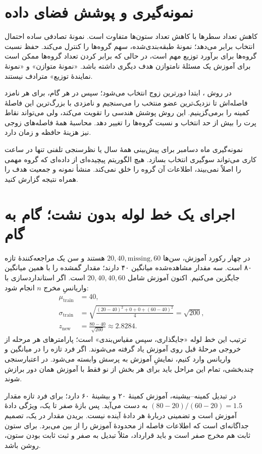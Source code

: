\section{نمونه‌گیری و پوشش فضای داده}
کاهش تعداد سطرها با کاهش تعداد ستون‌ها متفاوت است. نمونهٔ تصادفی ساده احتمال انتخاب برابر می‌دهد؛ نمونهٔ طبقه‌بندی‌شده، سهم گروه‌ها را کنترل می‌کند. حفظ نسبت گروه‌ها برای برآورد توزیع مهم است، در حالی که برابر کردن تعداد گروه‌ها ممکن است برای آموزش یک مسئلهٔ نامتوازن هدف دیگری داشته باشد. «نمونهٔ متوازن» و «نمونهٔ نمایندهٔ توزیع» مترادف نیستند.

در روش ، ابتدا دورترین زوج انتخاب می‌شود؛ سپس در هر گام، برای هر نامزد فاصله‌اش تا نزدیک‌ترین عضو منتخب را می‌سنجیم و نامزدی با بزرگ‌ترین این فاصلهٔ کمینه را برمی‌گزینیم. این روش پوشش هندسی را تقویت می‌کند، ولی می‌تواند نقاط پرت را بیش از حد انتخاب و نسبت گروه‌ها را تغییر دهد. محاسبهٔ همهٔ فاصله‌های زوجی نیز هزینهٔ حافظه و زمان دارد.

نمونه‌گیری ماه دسامبر برای پیش‌بینی همهٔ سال یا نظرسنجی تلفنی تنها در ساعت کاری می‌تواند سوگیری انتخاب بسازد. هیچ الگوریتم پیچیده‌ای از داده‌ای که گروه مهمی را اصلاً نمی‌بیند، اطلاعات آن گروه را خلق نمی‌کند. منشأ نمونه و جمعیت هدف را همراه نتیجه گزارش کنید.
\section{اجرای یک خط لوله بدون نشت؛ گام به گام}
در چهار رکورد آموزش، سن‌ها $20,40,\text{missing},60$ هستند و سن یک مراجعه‌کنندهٔ تازه ۸۰ است. سه مقدار مشاهده‌شده میانگین ۴۰ دارند؛ مقدار گمشده را با همین میانگین جایگزین می‌کنیم. اکنون آموزش شامل $20,40,40,60$ است. اگر استانداردسازی با واریانسِ مخرج $n$ انجام شود:
\begin{align*}
\mu_{\mathrm{train}}&=40,\\
\sigma_{\mathrm{train}}&=\sqrt{\frac{(20-40)^2+0+0+(60-40)^2}{4}}=\sqrt{200},\\
z_{\mathrm{new}}&=\frac{80-40}{\sqrt{200}}\approx2.8284.
\end{align*}
ترتیب این خط لوله «جایگذاری، سپس مقیاس‌بندی» است؛ پارامترهای هر مرحله از خروجی مرحلهٔ قبل روی آموزش یاد گرفته می‌شوند. اگر فرد تازه را در میانگین و واریانس وارد کنیم، نمایشِ آموزش به پرسش وابسته می‌شود. در اعتبارسنجی چندبخشی، تمام این مراحل باید برای هر بخش از نو فقط با آموزش همان دور برازش شوند.

در تبدیل کمینه–بیشینه، آموزش کمینهٔ ۲۰ و بیشینهٔ ۶۰ دارد؛ برای فرد تازه مقدار $(80-20)/(60-20)=1.5$ به دست می‌آید. پس بازهٔ صفر تا یک، ویژگی دادهٔ آموزش است و تضمینی دربارهٔ هر دادهٔ آینده نیست. بریدن مقدار در یک، تصمیم جداگانه‌ای است که اطلاعات فاصله از محدودهٔ آموزش را از بین می‌برد. برای ستون ثابت هم مخرج صفر است و باید قرارداد، مثلاً تبدیل به صفر و ثبت ثابت بودن ستون، روشن باشد.

